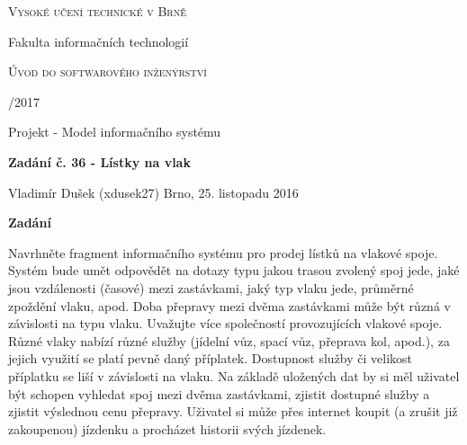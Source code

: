 \documentclass[12pt,a4paper,oneside]{article}
\begin{document}

\begin{center}
\begin{LARGE}

\textsc{Vysoké učení technické v Brně}

\medskip
Fakulta informačních technologií 

\vspace{3cm} 
\textsc{Úvod do softwarového inženýrství}

/2017

\vspace{3cm}
Projekt - Model informačního systému

\medskip
\textbf{Zadání č. 36 - Lístky na vlak}

\end{LARGE}
\end{center}

\begin{large}
\vfill 
Vladimír Dušek (xdusek27)
\hfill Brno, 25. listopadu 2016
\end{large}

\clearpage


\begin{LARGE}
\begin{center}
\textbf{Zadání}
\end{center}
\end{LARGE}

\bigskip
\noindent
Navrhněte fragment informačního systému pro prodej lístků na vlakové spoje. Systém bude umět odpovědět na dotazy typu jakou trasou zvolený spoj jede, jaké jsou vzdálenosti (časové) mezi zastávkami, jaký typ vlaku jede, průměrné zpoždění vlaku, apod. Doba přepravy mezi dvěma zastávkami může být různá v závislosti na typu vlaku. Uvažujte více společností provozujících vlakové spoje. Různé vlaky nabízí různé služby (jídelní vůz, spací vůz, přeprava kol, apod.), za jejich využití se platí pevně daný příplatek. Dostupnost služby či velikost příplatku se liší v závislosti na vlaku. Na základě uložených dat by si měl uživatel být schopen vyhledat spoj mezi dvěma zastávkami, zjistit dostupné služby a zjistit výslednou cenu přepravy. Uživatel si může přes internet koupit (a zrušit již zakoupenou) jízdenku a procházet historii svých jízdenek.
\end{document}
